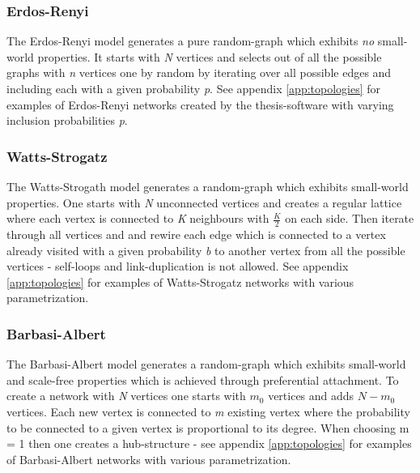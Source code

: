\documentclass[../Bachelorarbeit.tex]{subfiles}
\begin{document}
\subsubsection{Erdos-Renyi}
The Erdos-Renyi model generates a pure random-graph which exhibits \textit{no} small-world properties. It starts with \textit{N} vertices and selects out of all the possible graphs with \textit{n} vertices one by random by iterating over all possible edges and including each with a given probability \textit{p}. See appendix \ref{app:topologies} for examples of Erdos-Renyi networks created by the thesis-software with varying inclusion probabilities \textit{p}. \cite{ErdosRenyi1959}

\subsubsection{Watts-Strogatz}
The Watts-Strogath model generates a random-graph which exhibits small-world properties. One starts with \textit{N} unconnected vertices and creates a regular lattice where each vertex is connected to \textit{K} neighbours with $\frac{K}{2}$ on each side. Then iterate through all vertices and and rewire each edge which is connected to a vertex already visited with a given probability \textit{b} to another vertex from all the possible vertices - self-loops and link-duplication is not allowed. See appendix \ref{app:topologies} for examples of Watts-Strogatz networks with various parametrization. \cite{WattsStrogatz_DynamicsSmallWorld}

\subsubsection{Barbasi-Albert}
The Barbasi-Albert model generates a random-graph which exhibits small-world and scale-free properties which is achieved through preferential attachment. To create a network with \textit{N} vertices one starts with $m_0$ vertices and adds $N - m_0$ vertices. Each new vertex is connected to \textit{m} existing vertex where the probability to be connected to a given vertex is proportional to its degree. When choosing m = 1 then one creates a hub-structure - see appendix \ref{app:topologies} for examples of Barbasi-Albert networks with various parametrization. \cite{BarabasiAlbert_EmergenceScaling}
\end{document}
